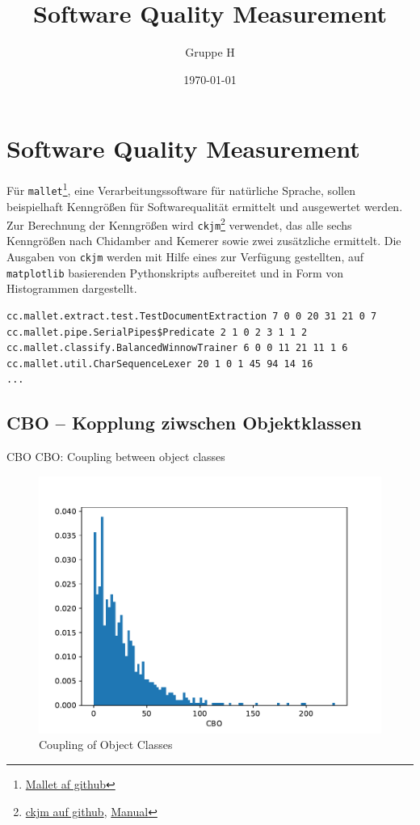 \documentclass{scrreprt}
\title{Software Quality Measurement}
\author{Gruppe H}
\date{\today}
\newcommand{\lstx}[1]{\lstinline$#1$}
\begin{document}
\maketitle
\tableofcontents

\chapter{Software Quality Measurement}

Für \lstx{mallet}\footnote{\href{https://github.com/mimno/Mallet}{Mallet af github}}, eine Verarbeitungssoftware für natürliche Sprache, sollen beispielhaft Kenngrößen für Softwarequalität ermittelt und ausgewertet werden. Zur Berechnung der Kenngrößen wird \lstx{ckjm}\footnote{\href{https://github.com/dspinellis/ckjm}{ckjm auf github},  \href{https://www.spinellis.gr/sw/ckjm/doc/indexw.html}{Manual}} verwendet, das alle sechs Kenngrößen nach Chidamber and Kemerer sowie zwei zusätzliche ermittelt. Die Ausgaben von \lstx{ckjm} werden mit Hilfe eines zur Verfügung gestellten, auf \lstx{matplotlib} basierenden Pythonskripts aufbereitet und in Form von Histogrammen dargestellt.

\begin{lstlisting}[caption = Beispiele für den Output von mallet]
cc.mallet.extract.test.TestDocumentExtraction 7 0 0 20 31 21 0 7
cc.mallet.pipe.SerialPipes$Predicate 2 1 0 2 3 1 1 2
cc.mallet.classify.BalancedWinnowTrainer 6 0 0 11 21 11 1 6
cc.mallet.util.CharSequenceLexer 20 1 0 1 45 94 14 16
...
\end{lstlisting}



\section{CBO – Kopplung ziwschen Objektklassen}
CBO 
CBO: Coupling between object classes

\begin{figure}
 \centering
 \includegraphics[width=.8\textwidth]{./CBO.pdf}
 \caption{Coupling of Object Classes}
 \label{abb:cbo}
\end{figure}
\end{document}
